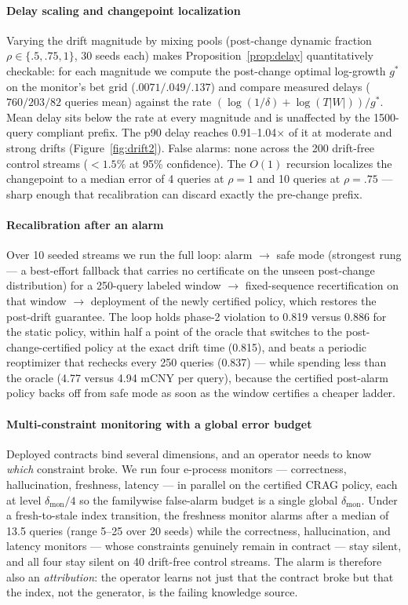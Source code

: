 \paragraph{Delay scaling and changepoint localization}
Varying the drift magnitude by mixing pools (post-change dynamic
fraction $\rho \in \{.5, .75, 1\}$, 30 seeds each) makes
Proposition~\ref{prop:delay} quantitatively checkable: for each
magnitude we compute the post-change optimal log-growth $g^\ast$ on the
monitor's bet grid ($.0071/.049/.137$) and compare measured delays
($760/203/82$ queries mean) against the rate
$(\log(1/\delta) + \log(T|W|))/g^\ast$. Mean delay sits below the rate
at every magnitude and is unaffected by the 1500-query compliant
prefix. The p90 delay reaches
0.91--1.04$\times$ of it at moderate and strong drifts
(Figure~\ref{fig:drift2}). False alarms: none across the 200
drift-free control streams ($<1.5\%$ at 95\% confidence). The $O(1)$ recursion localizes the changepoint to a median
error of 4 queries at $\rho = 1$ and 10 queries at $\rho = .75$ ---
sharp enough that recalibration can discard exactly the pre-change
prefix.

\paragraph{Recalibration after an alarm}
Over 10 seeded streams we run the full loop: alarm $\to$ safe mode
(strongest rung --- a best-effort fallback that carries no certificate
on the unseen post-change distribution) for a 250-query labeled window
$\to$ fixed-sequence recertification on that window $\to$ deployment of
the newly certified policy, which restores the post-drift guarantee.
The loop holds phase-2 violation to 0.819 versus 0.886
for the static policy, within half a point of the oracle that switches
to the post-change-certified policy at the exact drift time (0.815),
and beats a periodic reoptimizer that rechecks every 250 queries
(0.837) --- while spending less than the oracle (4.77 versus 4.94 mCNY
per query), because the certified post-alarm policy backs off from safe
mode as soon as the window certifies a cheaper ladder.

\paragraph{Multi-constraint monitoring with a global error budget}
Deployed contracts bind several dimensions, and an operator needs to
know \emph{which} constraint broke. We run four e-process monitors ---
correctness, hallucination, freshness, latency --- in parallel on the
certified CRAG policy, each at level $\delta_{\mathrm{mon}}/4$ so the
familywise false-alarm budget is a single global
$\delta_{\mathrm{mon}}$. Under a fresh-to-stale index transition, the
freshness monitor alarms after a median of 13.5 queries (range 5--25
over 20 seeds) while the correctness, hallucination, and latency
monitors --- whose constraints genuinely remain in contract ---
stay silent, and all four stay silent on 40 drift-free control
streams. The alarm is therefore also an \emph{attribution}: the
operator learns not just that the contract broke but that the index,
not the generator, is the failing knowledge source.

